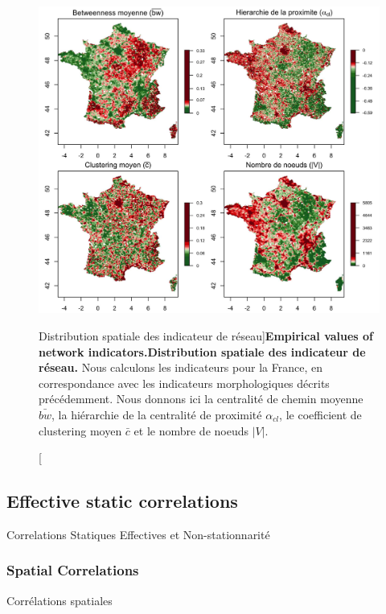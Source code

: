 \begin{figure}
\includegraphics[width=\linewidth]{Figures/Final/4-1-2-fig-staticcorrs-network}
\caption[Empirical values of network indicators][Distribution spatiale des indicateur de réseau]{\textbf{Empirical values of network indicators.}\label{fig:staticcorrs:network}}{\textbf{Distribution spatiale des indicateur de réseau.} Nous calculons les indicateurs pour la France, en correspondance avec les indicateurs morphologiques décrits précédemment. Nous donnons ici la centralité de chemin moyenne $\bar{bw}$, la hiérarchie de la centralité de proximité $\alpha_{cl}$, le coefficient de clustering moyen $\bar{c}$ et le nombre de noeuds $\left|V\right|$.\label{fig:staticcorrs:network}}
\end{figure}




\subsection{Effective static correlations}{Correlations Statiques Effectives et Non-stationnarité}



\subsubsection{Spatial Correlations}{Corrélations spatiales}


